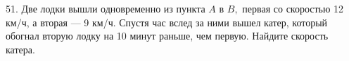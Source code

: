 51. Две лодки вышли одновременно из пункта $A$ в $B,$ первая со скоростью 12 км/ч, а вторая --- 9 км/ч. Спустя час вслед за ними вышел катер, который обогнал вторую лодку на 10 минут раньше, чем первую. Найдите скорость катера.\\
